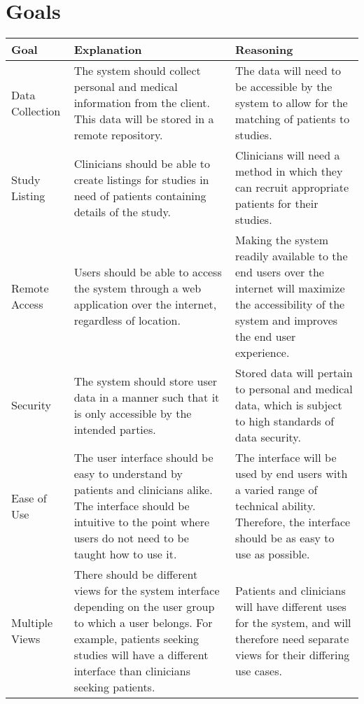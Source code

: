 \documentclass{article}
\begin{document}

\section{Goals}

\begin{table}[H]
\centering
\begin{tabular}{| p{3cm} | p{5cm} | p{5cm} |}
\hline
Goal & Explanation & Reasoning \\
\hline  \hline
Data Collection & The system should collect personal and medical information from the client. This data will be stored in a remote repository. & The data will need to be accessible by the system to allow for the matching of patients to studies. \\
\hline
Study Listing & Clinicians should be able to create listings for studies in need of patients containing details of the study. & Clinicians will need a method in which they can recruit appropriate patients for their studies.  \\
\hline
Remote Access & Users should be able to access the system through a web application over the internet, regardless of location. & Making the system readily available to the end users over the internet will maximize the accessibility of the system and improves the end user experience. \\
\hline
Security & The system should store user data in a manner such that it is only accessible by the intended parties. & Stored data will pertain to personal and medical data, which is subject to high standards of data security. \\
\hline
Ease of Use & The user interface should be easy to understand by patients and clinicians alike. The interface should be intuitive to the point where users do not need to be taught how to use it. & The interface will be used by end users with a varied range of technical ability. Therefore, the interface should be as easy to use as possible. \\
\hline
Multiple Views & There should be different views for the system interface depending on the user group to which a user belongs. For example, patients seeking studies will have a different interface than clinicians seeking patients. & Patients and clinicians will have different uses for the system, and will therefore need separate views for their differing use cases. \\
\hline


\end{tabular}
\end{table}
\end{document}
